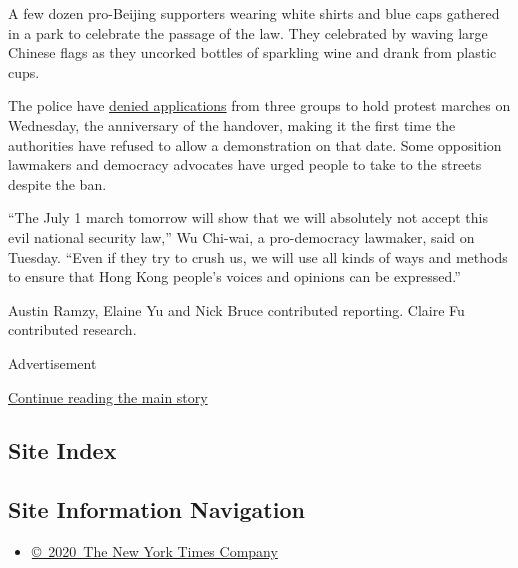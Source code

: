 A few dozen pro-Beijing supporters wearing white shirts and blue caps
gathered in a park to celebrate the passage of the law. They celebrated
by waving large Chinese flags as they uncorked bottles of sparkling wine
and drank from plastic cups.

The police have
\href{https://news.rthk.hk/rthk/en/component/k2/1534408-20200627.htm}{denied
applications} from three groups to hold protest marches on Wednesday,
the anniversary of the handover, making it the first time the
authorities have refused to allow a demonstration on that date. Some
opposition lawmakers and democracy advocates have urged people to take
to the streets despite the ban.

``The July 1 march tomorrow will show that we will absolutely not accept
this evil national security law,'' Wu Chi-wai, a pro-democracy lawmaker,
said on Tuesday. ``Even if they try to crush us, we will use all kinds
of ways and methods to ensure that Hong Kong people's voices and
opinions can be expressed.''

Austin Ramzy, Elaine Yu and Nick Bruce contributed reporting. Claire Fu
contributed research.

Advertisement

\protect\hyperlink{after-bottom}{Continue reading the main story}

\hypertarget{site-index}{%
\subsection{Site Index}\label{site-index}}

\hypertarget{site-information-navigation}{%
\subsection{Site Information
Navigation}\label{site-information-navigation}}

\begin{itemize}
\tightlist
\item
  \href{https://help.nytimes.com/hc/en-us/articles/115014792127-Copyright-notice}{©~2020~The
  New York Times Company}
\end{itemize}

